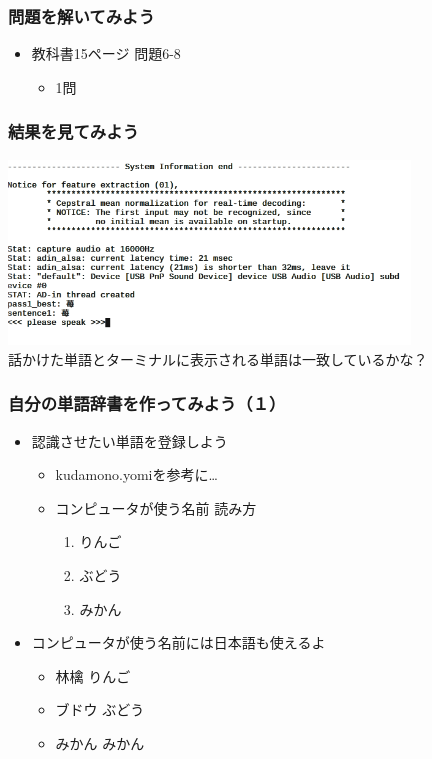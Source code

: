 \documentclass[14pt]{beamer}
\begin{document}
\begin{frame}
  \frametitle{問題を解いてみよう}
  \begin{itemize}
    \item 教科書15ページ 問題6-8
    \begin{itemize}
      \item 1問
    \end{itemize}
  \end{itemize}
\end{frame}

\begin{frame}
\frametitle{結果を見てみよう} 
  \centering
  \includegraphics[width=0.8\textwidth]{julius_demo_strawberry.png} \\
  話かけた単語とターミナルに表示される単語は一致しているかな？
\end{frame}

\begin{frame}
  \frametitle{自分の単語辞書を作ってみよう（１）}
  \begin{itemize}
    \item 認識させたい単語を登録しよう
    \begin{itemize}
      \item kudamono.yomiを参考に…
      \item \<コンピュータが使う名前\> \<読み方\>
      \renewcommand{\theenumi}{\roman{enumi}}
      \begin{enumerate}
        \item りんご
        \item ぶどう
        \item みかん
      \end{enumerate}
    \end{itemize}
    \item \<コンピュータが使う名前\>には日本語も使えるよ
    \begin{itemize}
      \item 林檎 りんご
      \item ブドウ ぶどう
      \item みかん みかん
    \end{itemize}
  \end{itemize}
\end{frame}
\end{document}
